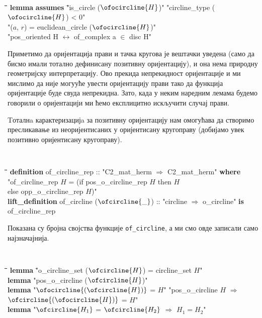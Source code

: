 {\tt
  \begin{tabbing}
    \hspace{5mm}\=\hspace{5mm}\=\hspace{5mm}\=\hspace{5mm}\=\hspace{5mm}\=\kill
{\bf lemma} \={\bf assumes} \="is\_circle ($\ofocircline{H}$)" "circline\_type ($\ofocircline{H}$) < 0"\\
\>\> "($a$, $r$) = euclidean\_circle ($\ofocircline{H}$)"\\
 "pos\_oriented H $\longleftrightarrow$ of\_complex a $\in$ disc H" 
  \end{tabbing}
}


\noindent Приметимо да оријентација прави и тачка кругова је вештачки
уведена (само да бисмо имали тотално дефинисану позитивну
оријентацију), и она нема природну геометријску интерпретацију. Ово
прекида непрекидност оријентације и ми мислимо да није могууће увести
оријентацију прави тако да функција оријентације буде свуда
непрекидна. Зато, када у неким наредним лемама будемо говорили о
оријентацији ми ћемо експлицитно искључити случај прави.

Tоталнa карактеризацијa за позитивну оријентацију нам омогућава да
створимо пресликавање из неоријентисаних у оријентисану кругоправу
(добијамо увек позитивно оријентисану кругоправу).

{\tt
  \begin{tabbing}
    \hspace{5mm}\=\hspace{5mm}\=\hspace{5mm}\=\hspace{5mm}\=\hspace{5mm}\=\kill
{\bf definition} of\_circline\_rep :: "C2\_mat\_herm $\Rightarrow$ C2\_mat\_herm" {\bf where}\\
\> "of\_circline\_rep $H$ = (\=if pos\_o\_circline\_rep $H$ then $H$\\
\>\>else opp\_o\_circline\_rep $H$)"\\
{\bf lift\_definition} of\_circline ($\ofcircline{\_}$) :: "circline $\Rightarrow$ o\_circline" {\bf is} of\_circline\_rep
  \end{tabbing}
}
\noindent Показана су бројна својства функције {\tt of\_circline}, а
ми смо овде записали само најзначајнија.

{\tt
  \begin{tabbing}
    \hspace{5mm}\=\hspace{5mm}\=\hspace{5mm}\=\hspace{5mm}\=\hspace{5mm}\=\kill
{\bf lemma} \="o\_circline\_set ($\ofcircline{H}$) = circline\_set $H$"\\
{\bf lemma} \>"pos\_o\_circline ($\ofcircline{H}$)"\\
{\bf lemma} \>"$\ofocircline{(\ofcircline{H})}$ = $H$" "pos\_o\_circline $H$ $\Longrightarrow$ $\ofcircline{(\ofocircline{H})}$ = $H$"\\
{\bf lemma} "$\ofcircline{H_1}$ = $\ofcircline{H_2}$ $\Longrightarrow$ $H_1 = H_2$"
  \end{tabbing}
}


